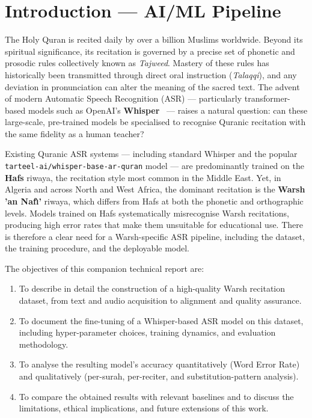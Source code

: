 \chapter*{Introduction --- AI/ML Pipeline}
\label{ch:mt_intro}

The Holy Quran is recited daily by over a billion Muslims worldwide. Beyond
its spiritual significance, its recitation is governed by a precise set of
phonetic and prosodic rules collectively known as \textit{Tajweed}. Mastery
of these rules has historically been transmitted through direct oral
instruction (\textit{Talaqqi}), and any deviation in pronunciation can
alter the meaning of the sacred text. The advent of modern Automatic Speech
Recognition (ASR) --- particularly transformer-based models such as OpenAI's
\textbf{Whisper}~\cite{radford2022whisper} --- raises a natural question: can
these large-scale, pre-trained models be specialised to recognise Quranic
recitation with the same fidelity as a human teacher?

\begin{warnbox}[title=Problem Statement]
Existing Quranic ASR systems --- including standard Whisper and the popular
\texttt{tarteel-ai/whisper-base-ar-quran} model --- are predominantly trained
on the \textbf{Hafs} riwaya, the recitation style most common in the Middle
East. Yet, in Algeria and across North and West Africa, the dominant
recitation is the \textbf{Warsh 'an Naf{\^\i}'} riwaya, which differs from
Hafs at both the phonetic and orthographic levels. Models trained on Hafs
systematically misrecognise Warsh recitations, producing high error rates
that make them unsuitable for educational use. There is therefore a clear
need for a Warsh-specific ASR pipeline, including the dataset, the training
procedure, and the deployable model.
\end{warnbox}

The objectives of this companion technical report are:
\begin{enumerate}
  \item To describe in detail the construction of a high-quality Warsh
        recitation dataset, from text and audio acquisition to alignment
        and quality assurance.
  \item To document the fine-tuning of a Whisper-based ASR model on this
        dataset, including hyper-parameter choices, training dynamics, and
        evaluation methodology.
  \item To analyse the resulting model's accuracy quantitatively (Word
        Error Rate) and qualitatively (per-surah, per-reciter, and
        substitution-pattern analysis).
  \item To compare the obtained results with relevant baselines and to
        discuss the limitations, ethical implications, and future
        extensions of this work.
\end{enumerate}

